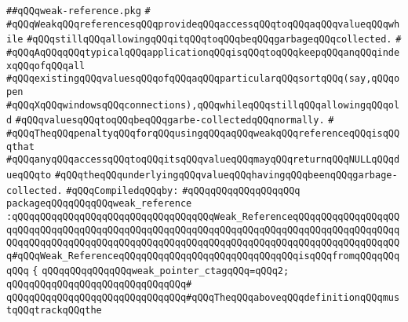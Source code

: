 \label{src/lib/std/src/nj/weak-reference.pkg}
\verb|##qQQqweak-reference.pkg|\newline
\verb|#|\newline
\verb|#qQQqWeakqQQqreferencesqQQqprovideqQQqaccessqQQqtoqQQqaqQQqvalueqQQqwhile|\newline
\verb|#qQQqstillqQQqallowingqQQqitqQQqtoqQQqbeqQQqgarbageqQQqcollected.|\newline
\verb|#|\newline
\verb|#qQQqAqQQqqQQqtypicalqQQqapplicationqQQqisqQQqtoqQQqkeepqQQqanqQQqindexqQQqofqQQqall|\newline
\verb|#qQQqexistingqQQqvaluesqQQqofqQQqaqQQqparticularqQQqsortqQQq(say,qQQqopen|\newline
\verb|#qQQqXqQQqwindowsqQQqconnections),qQQqwhileqQQqstillqQQqallowingqQQqold|\newline
\verb|#qQQqvaluesqQQqtoqQQqbeqQQqgarbe-collectedqQQqnormally.|\newline
\verb|#|\newline
\verb|#qQQqTheqQQqpenaltyqQQqforqQQqusingqQQqaqQQqweakqQQqreferenceqQQqisqQQqthat|\newline
\verb|#qQQqanyqQQqaccessqQQqtoqQQqitsqQQqvalueqQQqmayqQQqreturnqQQqNULLqQQqdueqQQqto|\newline
\verb|#qQQqtheqQQqunderlyingqQQqvalueqQQqhavingqQQqbeenqQQqgarbage-collected.|\newline
\newline
\verb|#qQQqCompiledqQQqby:|\newline
\verb|#qQQqqQQqqQQqqQQqqQQq|\newline
\newline
\verb|packageqQQqqQQqqQQqweak_reference|\newline
\verb|:qQQqqQQqqQQqqQQqqQQqqQQqqQQqqQQqqQQqWeak_ReferenceqQQqqQQqqQQqqQQqqQQqqQQqqQQqqQQqqQQqqQQqqQQqqQQqqQQqqQQqqQQqqQQqqQQqqQQqqQQqqQQqqQQqqQQqqQQqqQQqqQQqqQQqqQQqqQQqqQQqqQQqqQQqqQQqqQQqqQQqqQQqqQQqqQQqqQQqqQQqqQQq#qQQqWeak_ReferenceqQQqqQQqqQQqqQQqqQQqqQQqqQQqqQQqisqQQqfromqQQqqQQqqQQq|\newline
\verb|{|\newline
\verb|qQQqqQQqqQQqqQQqweak_pointer_ctagqQQq=qQQq2;|\newline
\verb|qQQqqQQqqQQqqQQqqQQqqQQqqQQqqQQq#|\newline
\verb|qQQqqQQqqQQqqQQqqQQqqQQqqQQqqQQq#qQQqTheqQQqaboveqQQqdefinitionqQQqmustqQQqtrackqQQqthe|\newline
